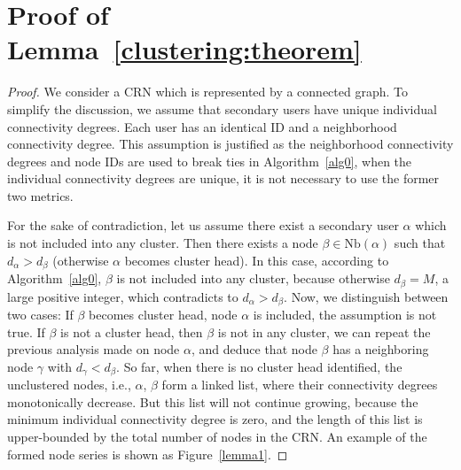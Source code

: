 \documentclass[times]{ettauth}
\newcommand{\ie}{i.e., }
\theoremstyle{mytheoremstyle}
\theoremstyle{mytheoremstyle}
\theoremstyle{mytheoremstyle}
\begin{document}
\section{Proof of Lemma~\ref{clustering:theorem}}
\begin{proof}
\label{proof_clustering:lemma1}
We consider a CRN which is represented by a connected graph.
To simplify the discussion, we assume that secondary users have unique individual connectivity degrees. 
Each user has an identical ID and a neighborhood connectivity degree.
This assumption is justified as the neighborhood connectivity degrees and node IDs are used to break ties in Algorithm~\ref{alg0}, when the individual connectivity degrees are unique, it is not necessary to use the former two metrics. 

For the sake of contradiction, let us assume there exist a secondary user $\alpha$ which is not included into any cluster.
Then there exists a node $\beta\in \text{Nb}(\alpha)$ such that $d_{\alpha} > d_{\beta}$ (otherwise $\alpha$ becomes cluster head). 
In this case, according to Algorithm~\ref{alg0}, $\beta$ is not included into any cluster, because otherwise $d_{\beta} = M$, a large positive integer, which contradicts to $d_{\alpha} > d_{\beta}$.
Now, we distinguish between two cases: 
If $\beta$ becomes cluster head, node $\alpha$ is included, the assumption is not true.
If $\beta$ is not a cluster head, then $\beta$ is not in any cluster, we can repeat the previous analysis made on node $\alpha$, and deduce that node $\beta$ has a neighboring node $\gamma$ with $d_{\gamma} < d_{\beta}$.
So far, when there is no cluster head identified, the unclustered nodes, \ie $\alpha$, $\beta$ form a linked list, where their connectivity degrees monotonically decrease.
But this list will not continue growing, because the minimum individual connectivity degree is zero, and the length of this list is upper-bounded by the total number of nodes in the CRN.
An example of the formed node series is shown as Figure~\ref{lemma1}.


\end{proof}
\end{document}
